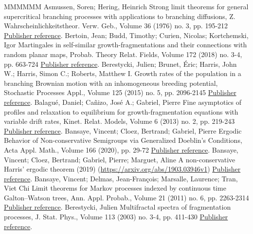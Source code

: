 \documentclass[11pt]{article}
\theoremstyle{definition}
\numberwithin{equation}{section}
\numberwithin{figure}{section}
\numberwithin{table}{section}
\begin{document}
\begin{thebibliography}{MMMMMM}
 Asmussen, Soren; Hering, Heinrich Strong limit theorems for general supercritical branching processes with applications to branching diffusions, Z. Wahrscheinlichkeitstheor. Verw. Geb., Volume 36 (1976) no. 3, pp. 195-212 \href{https://ahl.centre-mersenne.org/item/AHL_2020__3__795_0/#AsHer}{Publisher reference}.
 Bertoin, Jean; Budd, Timothy; Curien, Nicolas; Kortchemski, Igor Martingales in self-similar growth-fragmentations and their connections with random planar maps, Probab. Theory Relat. Fields, Volume 172 (2018) no. 3-4, pp. 663-724 \href{https://ahl.centre-mersenne.org/item/AHL_2020__3__795_0/#BBCK}{Publisher reference}.
 Berestycki, Julien; Brunet, Éric; Harris, John W.; Harris, Simon C.; Roberts, Matthew I. Growth rates of the population in a branching Brownian motion with an inhomogeneous breeding potential, Stochastic Processes Appl., Volume 125 (2015) no. 5, pp. 2096-2145 \href{https://ahl.centre-mersenne.org/item/AHL_2020__3__795_0/#BBHHR}{Publisher reference}.
 Balagué, Daniel; Cañizo, José A.; Gabriel, Pierre Fine asymptotics of profiles and relaxation to equilibrium for growth-fragmentation equations with variable drift rates, Kinet. Relat. Models, Volume 6 (2013) no. 2, pp. 219-243 \href{https://ahl.centre-mersenne.org/item/AHL_2020__3__795_0/#BCG-fine}{Publisher reference}.
 Bansaye, Vincent; Cloez, Bertrand; Gabriel, Pierre Ergodic Behavior of Non-conservative Semigroups via Generalized Doeblin’s Conditions, Acta Appl. Math., Volume 166 (2020), pp. 29-72 \href{https://ahl.centre-mersenne.org/item/AHL_2020__3__795_0/#BanCloGab}{Publisher reference}.
 Bansaye, Vincent; Cloez, Bertrand; Gabriel, Pierre; Marguet, Aline A non-conservative Harris’ ergodic theorem (2019) (\url{https://arxiv.org/abs/1903.03946v1}) \href{https://ahl.centre-mersenne.org/item/AHL_2020__3__795_0/#BCGM-qs}{Publisher reference}.
 Bansaye, Vincent; Delmas, Jean-François; Marsalle, Laurence; Tran, Viet Chi Limit theorems for Markov processes indexed by continuous time Galton–Watson trees, Ann. Appl. Probab., Volume 21 (2011) no. 6, pp. 2263-2314 \href{https://ahl.centre-mersenne.org/item/AHL_2020__3__795_0/#BDMT}{Publisher reference}.
 Berestycki, Julien Multifractal spectra of fragmentation processes, J. Stat. Phys., Volume 113 (2003) no. 3-4, pp. 411-430 \href{https://ahl.centre-mersenne.org/item/AHL_2020__3__795_0/#Beresty}{Publisher reference}.

\end{thebibliography}
\end{document}
